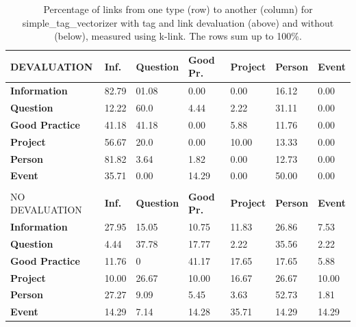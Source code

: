 \begin{table}
\begin{tabular}{| l | l | l | l | l | l | l | }
\hline
DEVALUATION & {\bf Inf. }& {\bf Question }& {\bf Good Pr.} & {\bf Project }&{\bf Person }& {\bf Event}  \\
\hline
{\bf Information} & 82.79 &  01.08  &  0.00  &  0.00  & 16.12 & 0.00  \\
{\bf Question} & 12.22&  60.0  &  4.44 &  2.22  & 31.11 & 0.00 \\
{\bf Good Practice} & 41.18 &  41.18  &  0.00  &  5.88  & 11.76 & 0.00 \\
{\bf Project }& 56.67 &  20.0  &  0.00  &  10.00  & 13.33 & 0.00 \\
{\bf Person} & 81.82 &  3.64  &  1.82  &  0.00  & 12.73 & 0.00 \\
{\bf Event }& 35.71 &  0.00  &  14.29  &  0.00  & 50.00 & 0.00 \\
\hline
\\
\hline
NO DEVALUATION & {\bf Inf. }& {\bf Question }& {\bf Good Pr.} & {\bf Project }&{\bf Person }& {\bf Event} \\
\hline
{\bf Information} &  27.95 & 15.05 & 10.75 & 11.83 & 26.86 & 7.53 \\
{\bf Question} & 4.44 & 37.78 & 17.77 & 2.22 & 35.56 & 2.22\\
{\bf Good Practice} & 11.76 & 0 & 41.17 & 17.65 &17.65 & 5.88\\
{\bf Project } & 10.00 & 26.67 & 10.00 &16.67 & 26.67 &10.00 \\
{\bf Person} & 27.27 & 9.09 & 5.45 & 3.63 & 52.73 & 1.81 \\
{\bf Event }& 14.29 & 7.14 & 14.28 & 35.71 & 14.29 & 14.29 \\
\hline
\end{tabular}

\caption{Percentage of links from one type (row) to another (column) for simple\_tag\_vectorizer with tag and link devaluation (above) and without (below), measured using k-link. The rows sum up to 100\%.}
\label{bayes_table2}
\end{table}

